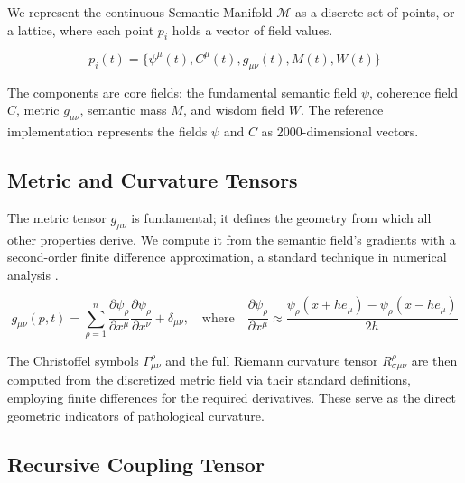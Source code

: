 We represent the continuous Semantic Manifold \(\mathcal{M}\) as a discrete set of points, or a lattice, where each point \(p_i\) holds a vector of field values.

\begin{equation}
p_i(t) = \{\psi^\mu(t), C^\mu(t), g_{\mu\nu}(t), M(t), W(t)\}
\end{equation}

The components are core fields: the fundamental semantic field \(\psi\), coherence field \(C\), metric \(g_{\mu\nu}\), semantic mass \(M\), and wisdom field \(W\). The reference implementation represents the fields \(\psi\) and \(C\) as 2000-dimensional vectors.


\subsection{Metric and Curvature Tensors}
\label{17.2.2:metric_and_curvature_tensors}

The metric tensor \(g_{\mu\nu}\) is fundamental; it defines the geometry from which all other properties derive. We compute it from the semantic field's gradients with a second-order finite difference approximation, a standard technique in numerical analysis \autocite{BurdenFairesBurden2015}.

\begin{equation}
g_{\mu\nu}(p,t) = \sum_{\rho=1}^n \frac{\partial \psi_\rho}{\partial x^\mu} \frac{\partial \psi_\rho}{\partial x^\nu} + \delta_{\mu\nu}, \quad \text{where} \quad \frac{\partial \psi_\rho}{\partial x^\mu} \approx \frac{\psi_\rho(x + h e_\mu) - \psi_\rho(x - h e_\mu)}{2h}
\end{equation}

The Christoffel symbols \(\Gamma^\rho_{\mu\nu}\) and the full Riemann curvature tensor \(R^{\rho}_{\sigma\mu\nu}\) are then computed from the discretized metric field via their standard definitions, employing finite differences for the required derivatives. These serve as the direct geometric indicators of pathological curvature.


\subsection{Recursive Coupling Tensor}
\label{17.2.3:recursive_coupling_tensor}

